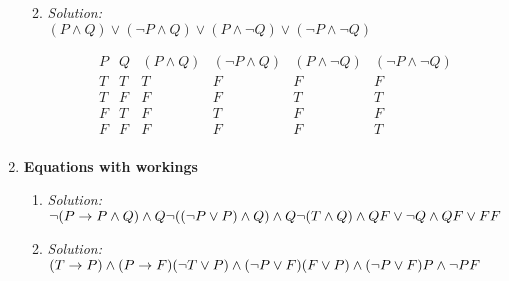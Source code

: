 \documentclass[11pt]{article}
\begin{document}
\begin{enumerate}
\begin{enumerate}
{}
% 
\item {\em Solution: \\ 
    $ (P \wedge Q) \vee (\neg P \wedge Q) \vee (P \wedge \neg Q) \vee (\neg P
        \wedge \neg Q) $
    
    \begin{displaymath}
        \begin{array}{|c|c|c|c|c|c|}
            
            P & Q & (P \wedge Q) & (\neg P \wedge Q) & (P \wedge \neg Q) & (\neg P
            \wedge \neg Q) \\
            \hline 

            T & T & T & F & F & F    \\
            T & F & F & F & T & T    \\ 
            F & T & F & T & F & F    \\
            F & F & F & F & F & T    \\
            
        \end{array}
    \end{displaymath}

}
\end{enumerate} 


%  
\item \textbf{Equations with workings} \marginpar{}\\
\begin{enumerate} 
\item {\em Solution: \\ 

    \( \neg (P \to P \wedge Q) \wedge Q  \\
       \neg ( (\neg P \vee P) \wedge Q) \wedge Q \\
       \neg (T \wedge Q) \wedge Q \\
       F \vee \neg Q \wedge Q \\
       F \vee F \\
       F\)
}
\item {\em Solution: \\ 

    \( (T \to P) \wedge (P \to F) \\
       ( \neg T \vee P) \wedge (\neg P \vee F) \\
        ( F \vee P) \wedge (\neg P \vee F) \\ 
        P \wedge \neg P \\
        F \)

}
\end{enumerate} 
%


\end{enumerate}
\end{document}
